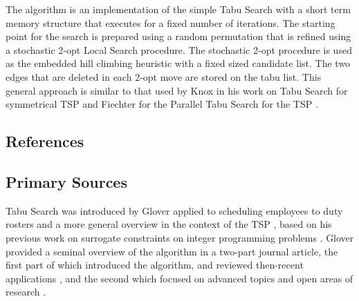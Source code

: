 The algorithm is an implementation of the simple Tabu Search with a short term memory structure that executes for a fixed number of iterations. The starting point for the search is prepared using a random permutation that is refined using a stochastic 2-opt Local Search procedure. The stochastic 2-opt procedure is used as the embedded hill climbing heuristic with a fixed sized candidate list. The two edges that are deleted in each 2-opt move are stored on the tabu list. This general approach is similar to that used by Knox in his work on Tabu Search for symmetrical TSP \cite{Knox1994} and Fiechter for the Parallel Tabu Search for the TSP \cite{Fiechter1994}.



\subsection{References}

% 
% 
\subsection{Primary Sources}
Tabu Search was introduced by Glover applied to scheduling employees to duty rosters \cite{Glover1986a} and a more general overview in the context of the TSP \cite{Glover1986}, based on his previous work on surrogate constraints on integer programming problems \cite{Glover1977}.
Glover provided a seminal overview of the algorithm in a two-part journal article, the first part of which introduced the algorithm, and reviewed then-recent applications \cite{Glover1989}, and the second which focused on advanced topics and open areas of research \cite{Glover1990}. 

